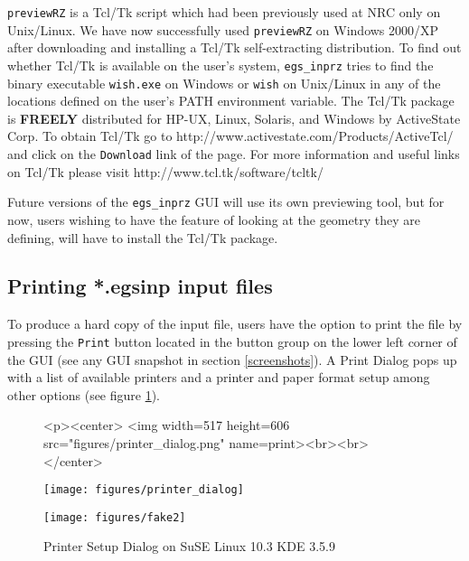 \documentclass[12pt,twoside]{article}   %
\begin{document}
{\tt previewRZ} is a Tcl/Tk script
which had been previously used at NRC only on Unix/Linux. We have now successfully used
{\tt previewRZ} on Windows 2000/XP after downloading and installing a Tcl/Tk
self-extracting distribution.
To find out whether
Tcl/Tk is available on the user's system, {\tt egs\_inprz} tries to find the binary
executable {\tt wish.exe} on Windows or {\tt wish} on Unix/Linux in any of the locations
defined on the user's PATH environment
variable.
The Tcl/Tk package is {\bf FREELY} distributed for HP-UX, Linux,
Solaris, and Windows by ActiveState Corp.
To obtain  Tcl/Tk go to
{http://www.activestate.com/Products/ActiveTcl/}
and click on the {\tt Download} link of the page. For more information and useful links
on Tcl/Tk please visit
{http://www.tcl.tk/software/tcltk/}

Future versions of the {\tt egs\_inprz} GUI will use its own
previewing tool, but for now, users wishing to have the feature of looking
at the geometry they are defining, will have to install the Tcl/Tk package.

\subsection{Printing *.egsinp input files}

 To produce a hard copy of the input file, users have the option to print the file
 by pressing the {\tt Print} button located in the button group on the lower left
 corner of the GUI (see any GUI snapshot in section \ref{screenshots}). A Print
 Dialog pops up with a list of available printers and a printer and  paper format
 setup among other options (see figure \ref{print}).\\

\begin{figure}[htb]
\begin{htmlonly}
\begin{rawhtml}
<p><center>
<img width=517 height=606 src="figures/printer_dialog.png" name=print><br><br>
</center>
\end{rawhtml}
\end{htmlonly}
\begin{latexonly}
\begin{center}
\texttt{[image: figures/printer\_dialog]}
\end{center}
\end{latexonly}
\begin{center}
\texttt{[image: figures/fake2]}
\end{center}
\caption{\label{print}Printer Setup Dialog on SuSE Linux 10.3 KDE 3.5.9}
\end{figure}
\end{document}

